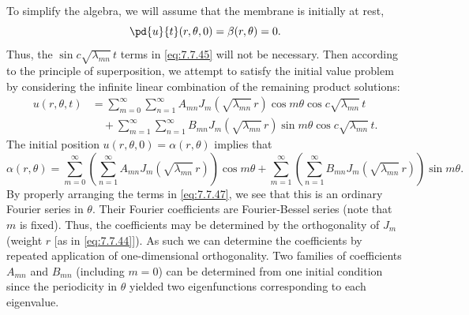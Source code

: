 To simplify the algebra, we will assume that the membrane is initially at rest,
\[
\pd{u}{t}(r,\theta,0) = \beta(r,\theta) = 0.
\]
Thus, the $\sin c\sqrt{\lambda_{mn}}\,t$ terms in \eqref{eq:7.7.45} will not be necessary.  Then according to the principle of superposition, we attempt to satisfy the initial value problem by considering the infinite linear combination of the remaining product solutions:
\begin{equation}
\boxed{\begin{aligned}
u(r,\theta,t) &= \sum_{m=0}^{\infty}\sum_{n=1}^{\infty} A_{mn} J_m\left(\sqrt{\lambda_{mn}}\,r\right)\cos m\theta\cos c\sqrt{\lambda_{mn}}\,t \\
&\quad + \sum_{m=1}^{\infty}\sum_{n=1}^{\infty} B_{mn} J_m\left(\sqrt{\lambda_{mn}}\,r\right)\sin m\theta\cos c\sqrt{\lambda_{mn}}\,t.
\end{aligned}}
\label{eq:7.7.46}
\end{equation}
The initial position $u(r,\theta,0) = \alpha(r,\theta)$ implies that
\begin{equation}
\alpha(r,\theta) = \sum_{m=0}^{\infty}\left(\sum_{n=1}^{\infty} A_{mn} J_m\left(\sqrt{\lambda_{mn}}\,r\right)\right)\cos m\theta + \sum_{m=1}^{\infty}\left(\sum_{n=1}^{\infty} B_{mn} J_m\left(\sqrt{\lambda_{mn}}\,r\right)\right)\sin m\theta.
\label{eq:7.7.47}
\end{equation}
By properly arranging the terms in \eqref{eq:7.7.47}, we see that this is an ordinary Fourier series in $\theta$.  Their Fourier coefficients are Fourier-Bessel series (note that $m$ is fixed).  Thus, the coefficients may be determined by the orthogonality of $J_m$ (weight $r$ [as in \eqref{eq:7.7.44}]).  As such we can determine the coefficients by repeated application of one-dimensional orthogonality.  Two families of coefficients $A_{mn}$ and $B_{mn}$ (including $m = 0$) can be determined from one initial condition since the periodicity in $\theta$ yielded two eigenfunctions corresponding to each eigenvalue.

